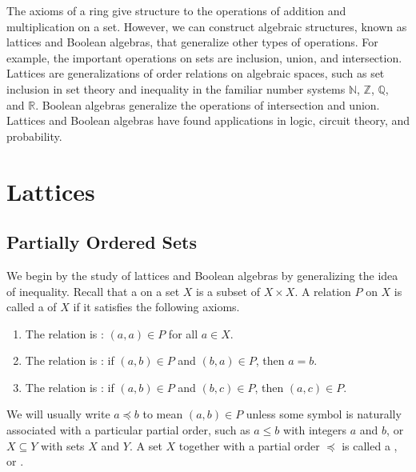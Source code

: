 
The axioms of a ring give structure to the operations of addition and multiplication on a set.  However, we can construct algebraic structures, known as lattices and Boolean algebras, that generalize other types of operations.  For example, the important operations on sets are inclusion, union, and intersection.  Lattices  are generalizations of order relations on algebraic spaces, such as set inclusion in set theory and inequality in the  familiar number systems ${\mathbb N}$, ${\mathbb Z}$, ${\mathbb Q}$, and ${\mathbb R}$.  Boolean algebras generalize the operations of intersection and union. Lattices and Boolean algebras have found applications in logic, circuit theory, and probability.   


\section{Lattices}\label{boolean_lattices}

\subsection*{Partially Ordered Sets}

We begin by the study of lattices and Boolean algebras by generalizing the idea of inequality. Recall that a  on a set $X$ is a subset of $X \times X$.  A relation $P$ on $X$ is called a  of $X$ if it satisfies the following axioms.  
\begin{enumerate}

\item
The relation is : $(a, a) \in P$ for all $a \in X$.

\item
The relation is : if $(a,b) \in P$ and $(b,a) \in P$, then $a = b$.

\item
The relation is : if $(a, b) \in P$ and $(b, c) \in P$, then $(a, c) \in P$.
 
\end{enumerate}
We will usually write $a \preceq b$\label{lessthan} to mean $(a, b) \in P$  unless some symbol is naturally associated with a particular partial order, such as $a \leq b$ with integers $a$ and $b$, or $X \subseteq Y$ with sets $X$ and $Y$.  A set $X$ together with a partial order $\preceq$ is called a , or . 


